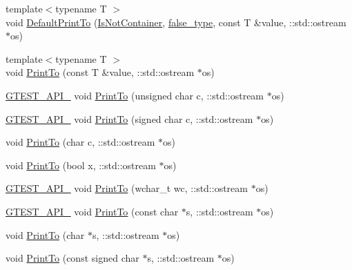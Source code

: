 \begin{DoxyCompactItemize}
\item 
{\footnotesize template$<$typename T $>$ }\\void \mbox{\hyperlink{namespacetesting_1_1internal_a78e4937ba564f01dac2ff25f3eece0ec}{Default\+Print\+To}} (\mbox{\hyperlink{namespacetesting_1_1internal_abf080521ce135deb510e0a7830fd3d33}{Is\+Not\+Container}}, \mbox{\hyperlink{namespacetesting_1_1internal_abb1d0789f19bdde21affccbd1078b525}{false\+\_\+type}}, const T \&value, \+::std\+::ostream $\ast$os)
\item 
{\footnotesize template$<$typename T $>$ }\\void \mbox{\hyperlink{namespacetesting_1_1internal_adb3c27150dbe661db0e0c4be27533460}{Print\+To}} (const T \&value, \+::std\+::ostream $\ast$os)
\item 
\mbox{\hyperlink{gtest-port_8h_aa73be6f0ba4a7456180a94904ce17790}{G\+T\+E\+S\+T\+\_\+\+A\+P\+I\+\_\+}} void \mbox{\hyperlink{namespacetesting_1_1internal_aa7e70a85d66f0c109e3e69629ef577f2}{Print\+To}} (unsigned char c, \+::std\+::ostream $\ast$os)
\item 
\mbox{\hyperlink{gtest-port_8h_aa73be6f0ba4a7456180a94904ce17790}{G\+T\+E\+S\+T\+\_\+\+A\+P\+I\+\_\+}} void \mbox{\hyperlink{namespacetesting_1_1internal_abf6c518b437569187c1218166c702807}{Print\+To}} (signed char c, \+::std\+::ostream $\ast$os)
\item 
void \mbox{\hyperlink{namespacetesting_1_1internal_a476bd3d411d4f129620aaf8999c257c0}{Print\+To}} (char c, \+::std\+::ostream $\ast$os)
\item 
void \mbox{\hyperlink{namespacetesting_1_1internal_a2979ac1ad3e05c51dcd7dca2eb34e6ce}{Print\+To}} (bool x, \+::std\+::ostream $\ast$os)
\item 
\mbox{\hyperlink{gtest-port_8h_aa73be6f0ba4a7456180a94904ce17790}{G\+T\+E\+S\+T\+\_\+\+A\+P\+I\+\_\+}} void \mbox{\hyperlink{namespacetesting_1_1internal_a6c50fd437a2ae2ff6f182ccd6c2744dd}{Print\+To}} (wchar\+\_\+t wc, \+::std\+::ostream $\ast$os)
\item 
\mbox{\hyperlink{gtest-port_8h_aa73be6f0ba4a7456180a94904ce17790}{G\+T\+E\+S\+T\+\_\+\+A\+P\+I\+\_\+}} void \mbox{\hyperlink{namespacetesting_1_1internal_ac226053b96d7d61f9407e3b75bab07d9}{Print\+To}} (const char $\ast$s, \+::std\+::ostream $\ast$os)
\item 
void \mbox{\hyperlink{namespacetesting_1_1internal_a553eec7bb50de01c9e91cac4accc606f}{Print\+To}} (char $\ast$s, \+::std\+::ostream $\ast$os)
\item 
void \mbox{\hyperlink{namespacetesting_1_1internal_a792cc5665a34619ed7a6d54711433456}{Print\+To}} (const signed char $\ast$s, \+::std\+::ostream $\ast$os)

\end{DoxyCompactItemize}
